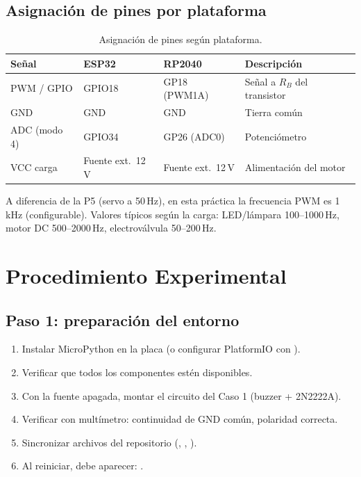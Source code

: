 \documentclass[11pt]{article}
\begin{document}
\subsection{Asignación de pines por plataforma}
\begin{table}[H]\centering
\caption{Asignación de pines según plataforma.}
\begin{tabular}{llll}
\toprule
Señal & ESP32 & RP2040 & Descripción \\
\midrule
PWM / GPIO & GPIO18 & GP18 (PWM1A) & Señal a $R_B$ del transistor \\
GND & GND & GND & Tierra común \\
ADC (modo 4) & GPIO34 & GP26 (ADC0) & Potenciómetro \\
VCC carga & Fuente ext.\ 12\,V & Fuente ext.\ 12\,V & Alimentación del motor \\
\bottomrule
\end{tabular}
\end{table}

\begin{nota}
A diferencia de la P5 (servo a 50\,Hz), en esta práctica la frecuencia PWM es 1\,kHz
(configurable). Valores típicos según la carga: LED/lámpara 100--1000\,Hz, motor DC
500--2000\,Hz, electroválvula 50--200\,Hz.
\end{nota}

\section{Procedimiento Experimental}

\subsection{Paso 1: preparación del entorno}
\begin{enumerate}
  \item Instalar MicroPython en la placa (o configurar PlatformIO con
        ).
  \item Verificar que todos los componentes estén disponibles.
  \item Con la fuente apagada, montar el circuito del Caso 1 (buzzer + 2N2222A).
  \item Verificar con multímetro: continuidad de GND común, polaridad correcta.
  \item Sincronizar archivos del repositorio (, ,
        ).
  \item Al reiniciar, debe aparecer: .
\end{enumerate}
\end{document}
